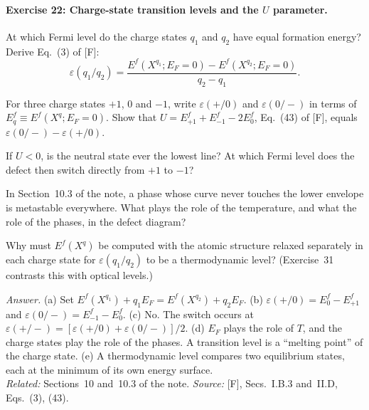 \documentclass[11pt]{article}      %
\numberwithin{equation}{section}   %
\begin{document}
\paragraph{Exercise 22: Charge-state transition levels and the $U$ parameter.}
\begin{parts}
    \item At which Fermi level do the charge states $q_1$ and $q_2$ have equal formation energy? Derive Eq.~(3) of [F]:
    \begin{equation*}
        \varepsilon(q_1/q_2) = \frac{E^f(X^{q_1}; E_F = 0) - E^f(X^{q_2}; E_F = 0)}{q_2 - q_1}.
    \end{equation*}
    \item For three charge states $+1$, $0$ and $-1$, write $\varepsilon(+/0)$ and $\varepsilon(0/-)$ in terms of $E^f_q \equiv E^f(X^q; E_F = 0)$. Show that $U = E^f_{+1} + E^f_{-1} - 2E^f_0$, Eq.~(43) of [F], equals $\varepsilon(0/-) - \varepsilon(+/0)$.
    \item If $U < 0$, is the neutral state ever the lowest line? At which Fermi level does the defect then switch directly from $+1$ to $-1$?
    \item In Section~10.3 of the note, a phase whose curve never touches the lower envelope is metastable everywhere. What plays the role of the temperature, and what the role of the phases, in the defect diagram?
    \item Why must $E^f(X^q)$ be computed with the atomic structure relaxed separately in each charge state for $\varepsilon(q_1/q_2)$ to be a thermodynamic level? (Exercise~31 contrasts this with optical levels.)
\end{parts}
\textit{Answer.} (a) Set $E^f(X^{q_1}) + q_1E_F = E^f(X^{q_2}) + q_2E_F$. (b) $\varepsilon(+/0) = E^f_0 - E^f_{+1}$ and $\varepsilon(0/-) = E^f_{-1} - E^f_0$. (c) No. The switch occurs at $\varepsilon(+/-) = [\varepsilon(+/0) + \varepsilon(0/-)]/2$. (d) $E_F$ plays the role of $T$, and the charge states play the role of the phases. A transition level is a ``melting point'' of the charge state. (e) A thermodynamic level compares two equilibrium states, each at the minimum of its own energy surface.\\
\textit{Related:} Sections~10 and~10.3 of the note. \textit{Source:} [F], Secs.~I.B.3 and~II.D, Eqs.~(3), (43).
\end{document}
